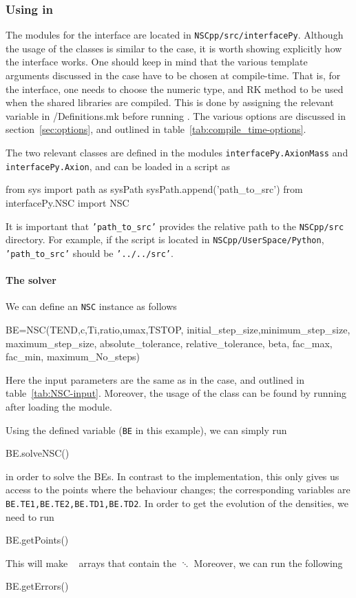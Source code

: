 \documentclass[11pt,a4paper]{article}
\begin{document}
\subsubsection{Using \nsc in \PY}\label{sec:begin_py}
%
The modules for the \PY interface are located in {\tt NSCpp/src/interfacePy}. Although the usage of the classes is similar to the \CPP case, it is worth showing explicitly how the \PY interface works. One should keep in mind that the various template arguments discussed in the \CPP case have to be chosen at compile-time. That is, for the \PY interface, one needs to choose the numeric type, and RK method to be used when the shared libraries are compiled. This is done by assigning the relevant variable in {\nsc/Definitions.mk} before running . The various options are discussed in section~\ref{sec:options}, and outlined in table~\ref{tab:compile_time-options}.

 
The two relevant classes are defined in the modules {\tt interfacePy.AxionMass} and {\tt interfacePy.Axion}, and can be loaded in a \PY script as 
%
\begin{py}
	from sys import path as sysPath
	sysPath.append('path_to_src')
	from interfacePy.NSC import NSC 
\end{py}
%
It is important that {\tt 'path\_to\_src'} provides the relative path to the {\tt NSCpp/src} directory. For example, if the script is located in {\tt NSCpp/UserSpace/Python}, {\tt 'path\_to\_src'} should be {\tt '../../src'}.

\paragraph{The solver}
%
We can define an {\tt NSC} instance as follows 
%
\begin{py}
	BE=NSC(TEND,c,Ti,ratio,umax,TSTOP,
		   initial_step_size,minimum_step_size, maximum_step_size, absolute_tolerance, 
		   relative_tolerance, beta, fac_max, fac_min, maximum_No_steps)
\end{py}
%
Here the input parameters are the same as in the \CPP case, and outlined in table~\ref{tab:NSC-input}. Moreover, the usage of the class can be found by running  after loading the module. 


Using the defined variable ({\tt BE} in this example), we can simply run  
%
\begin{py}
	BE.solveNSC()
\end{py}
%
in order to solve the BEs. In contrast to the \CPP implementation, this only gives us access to the points where the behaviour changes; the corresponding variables are {\tt BE.TE1,BE.TE2,BE.TD1,BE.TD2}. In order to get the evolution of the densities, we need to run 
%
\begin{py}
	BE.getPoints()
\end{py}
%
This will make ~\cite{harris2020array} arrays that contain the $\ddots$ Moreover, we can run the following
%
\begin{py}
	BE.getErrors()
\end{py}
\end{document}
